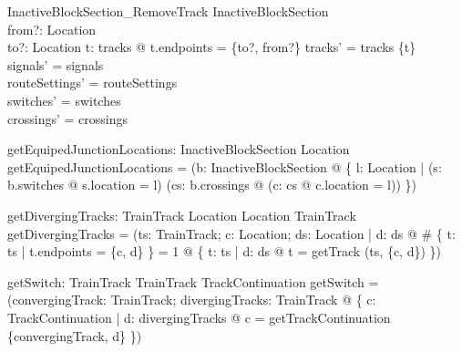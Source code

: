 \begin{schema}{InactiveBlockSection\_RemoveTrack}
  \Delta InactiveBlockSection\\
  from?: Location\\
  to?: Location
\where
  \exists  t: tracks @ t.endpoints = \{to?, from?\} \land  tracks' = tracks \setminus  \{t\}\\
  signals' = signals\\
  routeSettings' = routeSettings\\
  switches' = switches\\
  crossings' = crossings
\end{schema}

\begin{axdef}
  getEquipedJunctionLocations: InactiveBlockSection \fun  \finset  Location
\where
  getEquipedJunctionLocations = (\lambda  b: InactiveBlockSection @ \{  l: Location | (\exists  s: \ran  b.switches @ s.location = l) \lor  (\exists  cs: b.crossings @ (\exists  c: cs @ c.location = l)) \})
\end{axdef}

\begin{axdef}
  getDivergingTracks: \finset  TrainTrack \cross  Location \cross  \finset  Location \pfun  \finset  TrainTrack
\where
  getDivergingTracks = (\lambda  ts: \finset  TrainTrack; c: Location; ds: \finset  Location | \forall  d: ds @ \# \{  t: ts | t.endpoints = \{c, d\} \} = 1 @ \{  t: ts | \exists  d: ds @ t = getTrack (ts, \{c, d\}) \})
\end{axdef}

\begin{axdef}
  getSwitch: TrainTrack \cross  \finset  TrainTrack \fun  \finset  TrackContinuation
\where
  getSwitch = (\lambda  convergingTrack: TrainTrack; divergingTracks: \finset  TrainTrack @ \{  c: TrackContinuation | \exists  d: divergingTracks @ c = getTrackContinuation \{convergingTrack, d\} \})
\end{axdef}

